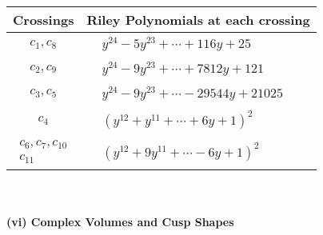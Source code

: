 \documentclass[1p]{elsarticle_modified}
\theoremstyle{definition}
\begin{document}
\begin{tabular}{m{50pt}|m{274pt}}
Crossings & \hspace{64pt}Riley Polynomials at each crossing \\
\hline $$\begin{aligned}c_{1},c_{8}\end{aligned}$$&$\begin{aligned}
&y^{24}-5 y^{23}+\cdots+116 y+25
\end{aligned}$\\
\hline $$\begin{aligned}c_{2},c_{9}\end{aligned}$$&$\begin{aligned}
&y^{24}-9 y^{23}+\cdots+7812 y+121
\end{aligned}$\\
\hline $$\begin{aligned}c_{3},c_{5}\end{aligned}$$&$\begin{aligned}
&y^{24}-9 y^{23}+\cdots-29544 y+21025
\end{aligned}$\\
\hline $$\begin{aligned}c_{4}\end{aligned}$$&$\begin{aligned}
&(y^{12}+y^{11}+\cdots+6 y+1)^{2}
\end{aligned}$\\
\hline $$\begin{aligned}c_{6},c_{7},c_{10}\\c_{11}\end{aligned}$$&$\begin{aligned}
&(y^{12}+9 y^{11}+\cdots-6 y+1)^{2}
\end{aligned}$\\
\hline
\end{tabular}\\~\\
\newpage\flushleft \textbf{(vi) Complex Volumes and Cusp Shapes}
\end{document}
